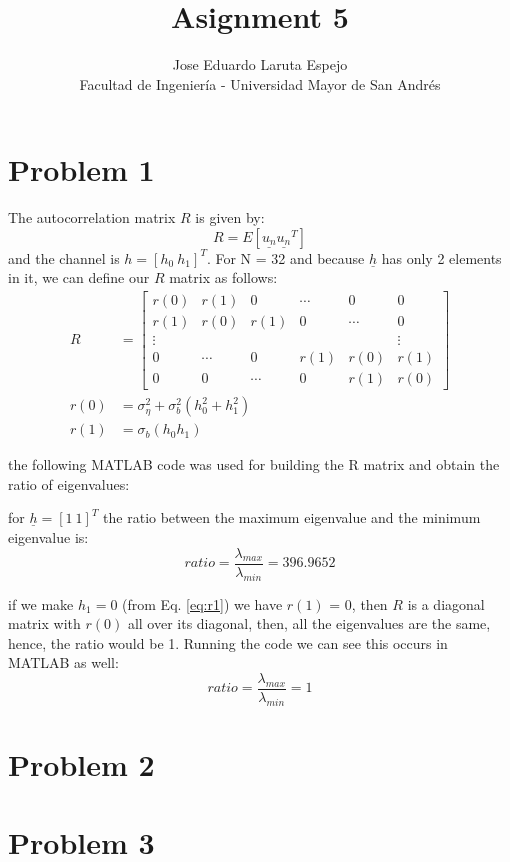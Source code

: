 \documentclass[12pt,letterpaper]{article}
\title{Asignment 5}
\author{Jose Eduardo Laruta Espejo \\ Facultad de Ingeniería - Universidad Mayor de San Andrés}
\begin{document}
\maketitle
\section{Problem 1}

The autocorrelation matrix $R$ is given by:
\begin{equation*}
  R = E[\underline{u_n} \underline{u_n}^{T}]
\end{equation*}
and the channel is $h = [h_0 \ h_1]^T$. For N = 32 and because $\underline{h}$ has only 2 elements in it, 
we can define our $R$ matrix as follows:
\begin{align}
  R &= \begin{bmatrix}
    r(0)    & r(1)  & 0       & \cdots  & 0       & 0       \\
    r(1)    & r(0)  & r(1)    & 0       & \cdots  & 0       \\
    \vdots  &       &         &         &         & \vdots \\
    0       & \cdots& 0       & r(1)    & r(0)    & r(1)    \\
    0       & 0     & \cdots  & 0       & r(1)    & r(0)
  \end{bmatrix} \\
  r(0) &= \sigma_\eta^2 + \sigma_b^2 (h_0^2 + h_1^2) \\
  r(1) &= \sigma_b (h_0 h_1)\label{eq:r1}
\end{align}

the following MATLAB code was used for building the R matrix and obtain the ratio of eigenvalues:



for $\underline{h} = [1 \  1]^T$ the ratio between the maximum eigenvalue and the minimum eigenvalue is:
$$ratio = \frac{\lambda_{max}}{\lambda_{min}} = 396.9652$$


if we make $h_1 = 0$ (from Eq. \ref{eq:r1}) we have $r(1)$ = 0, then $R$ is a diagonal matrix with $r(0)$ 
all over its diagonal, then, all the eigenvalues are the same, hence, the ratio would be 1. Running the code 
we can see this occurs in MATLAB as well:
$$ratio = \frac{\lambda_{max}}{\lambda_{min}} = 1$$


\section{Problem 2}

\newpage
\section{Problem 3}
\end{document}
